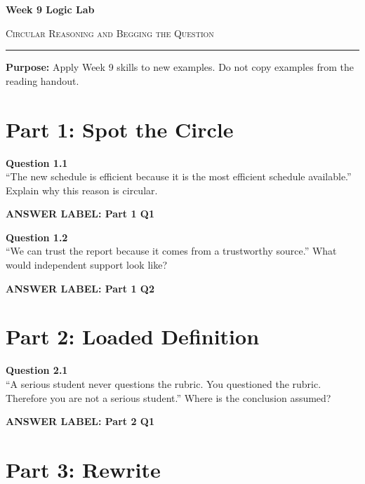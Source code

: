 \documentclass[12pt]{article}
\newcommand{\answerbox}[2]{%
\vspace{0.15em}
\noindent\textbf{#1}\par
\vspace{0.05em}
\noindent\fbox{%
\begin{minipage}[t][#2]{\dimexpr\textwidth-2\fboxsep-2\fboxrule}
\rule{\textwidth}{0pt}
\vspace{#2}
\end{minipage}
}\par
\vspace{0.25em}
}
\begin{document}
\begin{center}
{\LARGE\bfseries Week 9 Logic Lab}\par\vspace{0.05em}
{\large\scshape Circular Reasoning and Begging the Question}\par\vspace{0.1em}
\rule{0.78\textwidth}{0.5pt}\par\vspace{0.15em}
\end{center}

\noindent\textbf{Purpose:} Apply Week 9 skills to new examples. Do not copy examples from the reading handout.

\vspace{0.3em}

\section*{Part 1: Spot the Circle}

\textbf{Question 1.1}\\[-0.15em]
``The new schedule is efficient because it is the most efficient schedule available.'' Explain why this reason is circular.

\answerbox{ANSWER LABEL: Part 1 Q1}{2.15in}

\textbf{Question 1.2}\\[-0.15em]
``We can trust the report because it comes from a trustworthy source.'' What would independent support look like?

\answerbox{ANSWER LABEL: Part 1 Q2}{2.15in}

\newpage

\section*{Part 2: Loaded Definition}

\textbf{Question 2.1}\\[-0.15em]
``A serious student never questions the rubric. You questioned the rubric. Therefore you are not a serious student.'' Where is the conclusion assumed?

\answerbox{ANSWER LABEL: Part 2 Q1}{2.45in}

\newpage

\section*{Part 3: Rewrite}
\end{document}
